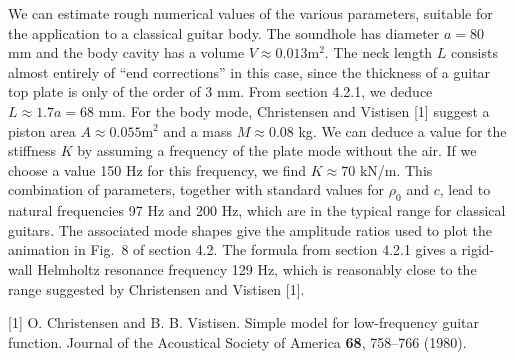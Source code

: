   We can estimate rough numerical values of the various parameters, suitable 
  for the application to a classical guitar body. The soundhole has diameter 
  $a=80$ mm and the body cavity has a volume $V \approx 0.013 \mathrm{m}^2$. 
  The neck length $L$ consists almost entirely of ``end corrections'' in this 
  case, since the thickness of a guitar top plate is only of the order of 3 mm. 
  From section 4.2.1, we deduce $L \approx 1.7 a = 68$ mm. For the body mode, 
  Christensen and Vistisen [1] suggest a piston area $A \approx 0.055 
  \mathrm{m}^2$ and a mass $M \approx 0.08$ kg. We can deduce a value for the 
  stiffness $K$ by assuming a frequency of the plate mode without the air. If 
  we choose a value 150 Hz for this frequency, we find $K \approx 70$ kN/m. 
  This combination of parameters, together with standard values for $\rho_0$ 
  and $c$, lead to natural frequencies 97 Hz and 200 Hz, which are in the 
  typical range for classical guitars. The associated mode shapes give the 
  amplitude ratios used to plot the animation in Fig.\ 8 of section 4.2. The 
  formula from section 4.2.1 gives a rigid-wall Helmholtz resonance frequency 
  129 Hz, which is reasonably close to the range suggested by Christensen and 
  Vistisen [1]. 

  \sectionreferences{}[1] O. Christensen and B. B. Vistisen. Simple model for 
  low-frequency guitar function. Journal of the Acoustical Society of America 
  \textbf{68}, 758–766 (1980). 